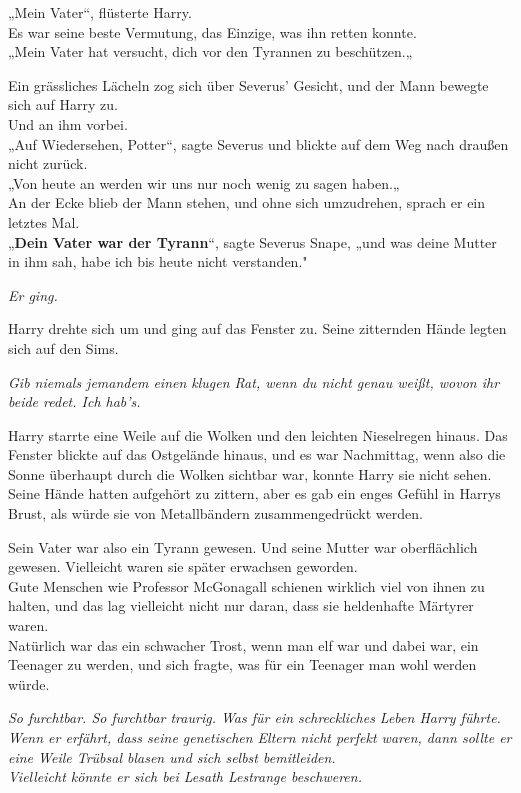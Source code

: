 {„Mein Vater“, flüsterte Harry.\\ Es war seine beste Vermutung, das Einzige, was ihn retten konnte.\\ „Mein Vater hat versucht, dich vor den Tyrannen zu beschützen.„

Ein grässliches Lächeln zog sich über Severus' Gesicht, und der Mann bewegte sich auf Harry zu.\\ Und an ihm vorbei.\\ „Auf Wiedersehen, Potter“, sagte Severus und blickte auf dem Weg nach draußen nicht zurück.\\ „Von heute an werden wir uns nur noch wenig zu sagen haben.„\\ An der Ecke blieb der Mann stehen, und ohne sich umzudrehen, sprach er ein letztes Mal.\\ „\textbf{Dein Vater war der Tyrann}“, sagte Severus Snape, „und was deine Mutter in ihm sah, habe ich bis heute nicht verstanden."

\emph{Er ging.}

Harry drehte sich um und ging auf das Fenster zu. Seine zitternden Hände legten sich auf den Sims.

\emph{Gib niemals jemandem einen klugen Rat, wenn du nicht genau weißt, wovon ihr} \emph{beide redet. Ich hab's.}

Harry starrte eine Weile auf die Wolken und den leichten Nieselregen hinaus. Das Fenster blickte auf das Ostgelände hinaus, und es war Nachmittag, wenn also die Sonne überhaupt durch die Wolken sichtbar war, konnte Harry sie nicht sehen.\\ Seine Hände hatten aufgehört zu zittern, aber es gab ein enges Gefühl in Harrys Brust, als würde sie von Metallbändern zusammengedrückt werden.

Sein Vater war also ein Tyrann gewesen. Und seine Mutter war oberflächlich gewesen. Vielleicht waren sie später erwachsen geworden.\\ Gute Menschen wie Professor McGonagall schienen wirklich viel von ihnen zu halten, und das lag vielleicht nicht nur daran, dass sie heldenhafte Märtyrer waren.\\ Natürlich war das ein schwacher Trost, wenn man elf war und dabei war, ein Teenager zu werden, und sich fragte, was für ein Teenager man wohl werden würde.

\emph{So furchtbar. So furchtbar traurig. Was für ein schreckliches Leben Harry führte. Wenn er erfährt, dass seine genetischen Eltern nicht perfekt waren, dann sollte er eine Weile Trübsal blasen und sich selbst bemitleiden.\\ Vielleicht könnte er sich bei Lesath Lestrange beschweren.}

}
